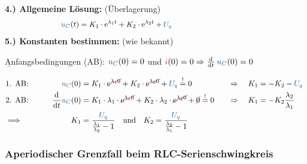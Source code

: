 %
\begin{frame}\ftx{\subsubsecname}%
    \textbf{4.) Allgemeine Lösung:} (Überlagerung)%
    \begin{align}
        &&
            \ecv{u_C}(t) &= K_1 \cdot \mathrm{e}^{\lambda_1 t} + K_2 \cdot \mathrm{e}^{\lambda_2 t} + \ecv{U_q} \nonumber\\[-14pt]
        &\hphantom{1Rooooooo}&\hphantom{2Loooooo}&\hphantom{2Roooooooooooooooooooooooooooooooooo}&\hphantom{3Loooooo}&\hphantom{3Roooooooooo} \nonumber %
    \end{align}
    \pause%
    \textbf{5.) Konstanten bestimmen:} (wie bekannt)

    \b{\vspace{4pt}Anfangsbedingungen (AB): $\ecv{u_C}(0)=0$ und $\eci{i}(0)=0 \Rightarrow \dt\, \ecv{u_C}(0) = 0 $}

    \begin{align*}
        &\hphantom{1Rooooooo}&\hphantom{2Loooooo}&\hphantom{2Roooooooooooooooooooooooooooooooooo}&\hphantom{3Loooooo}&\hphantom{3Roooooooooo}\\[-15pt] %
        &\text{1. AB:}&
            \ecv{u_C}(0) &= K_1 \cdot \redcancel{\mathrm{e}^{\lambda_1 0}} + K_2 \cdot \redcancel{\mathrm{e}^{\lambda_2 0}} + \ecv{U_q} \overset{!}{=} 0 & \Rightarrow\quad K_1 &= -K_2 -\ecv{U_q}\\
        &\text{2. AB:}&
            \dt \ecv{u_C}(0) &= K_1 \cdot \lambda_1 \cdot \redcancel{\mathrm{e}^{\lambda_1 0}} + K_2 \cdot \lambda_2 \cdot \redcancel{\mathrm{e}^{\lambda_2 0}} + \redcancel{0} \overset{!}{=} 0 &  \Rightarrow\quad K_1 &= - K_2 \frac{\lambda_2}{\lambda_1} \nonumber\\
        &\Longrightarrow&
            K_1 &=  \frac{\ecv{U_q}}{\frac{\lambda_1}{\lambda_2}-1} \quad\text{und}\quad
                K_2 = \frac{\ecv{U_q}}{\frac{\lambda_2}{\lambda_1}-1}
    \end{align*}

\end{frame}


\subsubsection[Aperiodischer Grenzfall]{Aperiodischer Grenzfall beim RLC-Serienschwingkreis}
\label{sec:schaltvorgaengezeitbereich:rlc:grenzfall}

